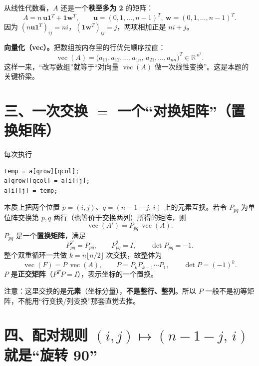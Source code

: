 \documentclass[11pt,a4paper,UTF8]{ctexart}
\begin{document}
\begin{center}
\MatA
\end{center}

从线性代数看，$A$ 还是一个\textbf{秩至多为 2} 的矩阵：
\[
A=n\,\mathbf{u}\mathbf{1}^{T}+\mathbf{1}\mathbf{w}^{T},\qquad
\mathbf{u}=(0,1,\dots,n-1)^{T},\ \mathbf{w}=(0,1,\dots,n-1)^{T}.
\]
因为 $(n\mathbf{u}\mathbf{1}^{T})_{ij}=ni$，$(\mathbf{1}\mathbf{w}^{T})_{ij}=j$，两项相加正是 $ni+j$。

\smallskip
\textbf{向量化（vec）。}把数组按内存里的行优先顺序拉直：
\[
\operatorname{vec}(A)=\bigl(a_{11},a_{12},\dots,a_{1n},\,a_{21},\dots,a_{nn}\bigr)^{T}\in\mathbb{R}^{\,n^{2}}.
\]
这样一来，“改写数组”就等于“对向量 $\operatorname{vec}(A)$ 做一次线性变换”。这是本题的关键桥梁。

\section*{三、一次交换 $=$ 一个“对换矩阵”（置换矩阵）}

每次执行
\begin{lstlisting}
temp = a[qrow][qcol];
a[qrow][qcol] = a[i][j];
a[i][j] = temp;
\end{lstlisting}
本质上把两个位置 $p=(i,j)$、$q=(n{-}1{-}j,\,i)$ 上的元素互换。若令 $P_{pq}$ 为单位阵交换第 $p,q$ 两行（也等价于交换两列）所得的矩阵，则
\[
\operatorname{vec}(A')=P_{pq}\,\operatorname{vec}(A).
\]
$P_{pq}$ 是一个\textbf{置换矩阵}，满足
\[
P_{pq}^{T}=P_{pq},\qquad P_{pq}^{2}=I,\qquad \det P_{pq}=-1 .
\]
整个双重循环一共做 $k=n\lfloor n/2\rfloor$ 次交换，故整体为
\[
\boxed{\ \operatorname{vec}(F)=P\,\operatorname{vec}(A),\qquad P=P_{k}P_{k-1}\cdots P_{1},\qquad \det P=(-1)^{k}.\ }
\]
$P$ 是\textbf{正交矩阵}（$P^{T}P=I$），表示坐标的一个置换。

\begin{warnbox}
注意：这里交换的是\textbf{元素}（坐标分量），\textbf{不是整行、整列}。所以 $P$ 一般不是初等矩阵，不能用“行变换/列变换”那套直觉去推。
\end{warnbox}

\section*{四、配对规则 $(i,j)\mapsto(n{-}1{-}j,\,i)$ 就是“旋转 90\textdegree”}
\end{document}
